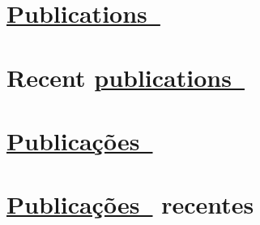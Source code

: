  {
	 {
		\section{\href{https://scholar.google.com/citations?user=pD4KMUsAAAAJ}{Publications~\scriptsize\faLink}}
	}{
		\section{Recent \href{https://scholar.google.com/citations?user=pD4KMUsAAAAJ}{publications~\scriptsize\faLink}}
	}
} {
	 {
		\section{\href{https://scholar.google.com/citations?user=pD4KMUsAAAAJ}{Publicações~\scriptsize\faLink}}
	} {
		\section{\href{https://scholar.google.com/citations?user=pD4KMUsAAAAJ}{Publicações~\scriptsize\faLink} recentes}
	}
}
